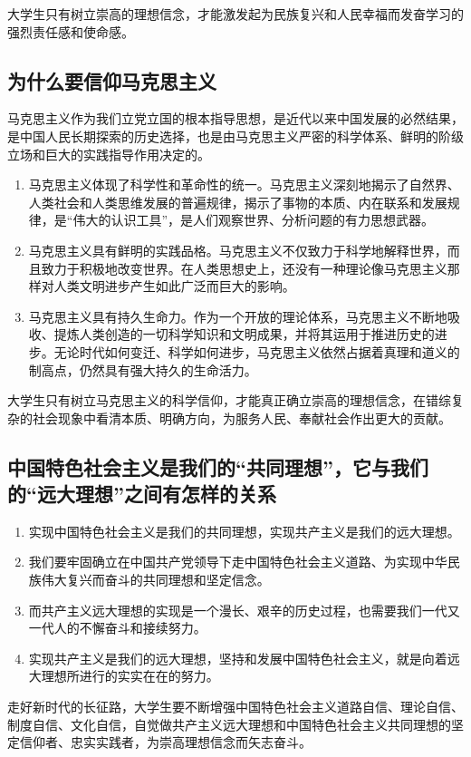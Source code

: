 大学生只有树立崇高的理想信念，才能激发起为民族复兴和人民幸福而发奋学习的强烈责任感和使命感。

\subsection{为什么要信仰马克思主义}
马克思主义作为我们立党立国的根本指导思想，是近代以来中国发展的必然结果，是中国人民长期探索的历史选择，也是由马克思主义严密的科学体系、鲜明的阶级立场和巨大的实践指导作用决定的。
\begin{enumerate}
\item 马克思主义体现了科学性和革命性的统一。马克思主义深刻地揭示了自然界、人类社会和人类思维发展的普遍规律，揭示了事物的本质、内在联系和发展规律，是“伟大的认识工具”，是人们观察世界、分析问题的有力思想武器。
\item 马克思主义具有鲜明的实践品格。马克思主义不仅致力于科学地解释世界，而且致力于积极地改变世界。在人类思想史上，还没有一种理论像马克思主义那样对人类文明进步产生如此广泛而巨大的影响。
\item 马克思主义具有持久生命力。作为一个开放的理论体系，马克思主义不断地吸收、提炼人类创造的一切科学知识和文明成果，并将其运用于推进历史的进步。无论时代如何变迁、科学如何进步，马克思主义依然占据着真理和道义的制高点，仍然具有强大持久的生命活力。
\end{enumerate}

大学生只有树立马克思主义的科学信仰，才能真正确立崇高的理想信念，在错综复杂的社会现象中看清本质、明确方向，为服务人民、奉献社会作出更大的贡献。

\subsection{中国特色社会主义是我们的“共同理想”，它与我们的“远大理想”之间有怎样的关系}
\begin{enumerate}
\item 实现中国特色社会主义是我们的共同理想，实现共产主义是我们的远大理想。
\item 我们要牢固确立在中国共产党领导下走中国特色社会主义道路、为实现中华民族伟大复兴而奋斗的共同理想和坚定信念。
\item 而共产主义远大理想的实现是一个漫长、艰辛的历史过程，也需要我们一代又一代人的不懈奋斗和接续努力。
\item 实现共产主义是我们的远大理想，坚持和发展中国特色社会主义，就是向着远大理想所进行的实实在在的努力。
\end{enumerate}

走好新时代的长征路，大学生要不断增强中国特色社会主义道路自信、理论自信、制度自信、文化自信，自觉做共产主义远大理想和中国特色社会主义共同理想的坚定信仰者、忠实实践者，为崇高理想信念而矢志奋斗。

